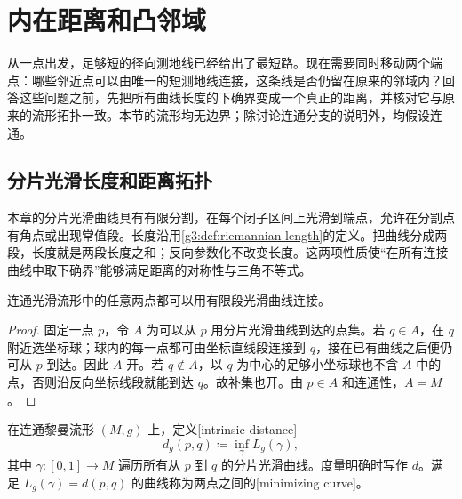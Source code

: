 
% 
% 

\section{内在距离和凸邻域}
\label{g3:sec:0202}

从一点出发，足够短的径向测地线已经给出了最短路。现在需要同时移动两个端点：哪些邻近点可以由唯一的短测地线连接，这条线是否仍留在原来的邻域内？回答这些问题之前，先把所有曲线长度的下确界变成一个真正的距离，并核对它与原来的流形拓扑一致。本节的流形均无边界；除讨论连通分支的说明外，均假设连通。

\subsection{分片光滑长度和距离拓扑}
\label{g3:subsec:0202:01}

本章的分片光滑曲线具有有限分割，在每个闭子区间上光滑到端点，允许在分割点有角点或出现常值段。长度沿用\cref{g3:def:riemannian-length}的定义。把曲线分成两段，长度就是两段长度之和；反向参数化不改变长度。这两项性质使“在所有连接曲线中取下确界”能够满足距离的对称性与三角不等式。

\begin{lemma}
	\label{g3:lem:piecewise-smooth-connected}
	连通光滑流形中的任意两点都可以用有限段光滑曲线连接。
\end{lemma}
\begin{proof}
	固定一点 \(p\)，令 \(A\) 为可以从 \(p\) 用分片光滑曲线到达的点集。若 \(q\in A\)，在 \(q\) 附近选坐标球；球内的每一点都可由坐标直线段连接到 \(q\)，接在已有曲线之后便仍可从 \(p\) 到达。因此 \(A\) 开。若 \(q\notin A\)，以 \(q\) 为中心的足够小坐标球也不含 \(A\) 中的点，否则沿反向坐标线段就能到达 \(q\)。故补集也开。由 \(p\in A\) 和连通性，\(A=M\)。
\end{proof}

\begin{definition}
	\label{g3:def:riemannian-distance}
	在连通黎曼流形 \((M,g)\) 上，定义[intrinsic distance]
	\begin{equation}
		\label{g3:eq:riemannian-distance}
		d_g(p,q)\coloneqq\inf_{\gamma}L_g(\gamma),
	\end{equation}
	其中 \(\gamma:[0,1]\to M\) 遍历所有从 \(p\) 到 \(q\) 的分片光滑曲线。度量明确时写作 \(d\)。满足 \(L_g(\gamma)=d(p,q)\) 的曲线称为两点之间的[minimizing curve]。
\end{definition}

